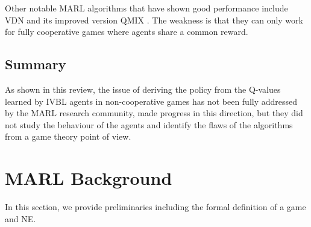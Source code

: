 \documentclass[]{interact}
\theoremstyle{plain}%
\theoremstyle{definition}
\theoremstyle{remark}
\begin{document}
Other notable MARL algorithms that have shown good performance include VDN \cite{sunehag2017value} and its improved version QMIX \cite{rashid2020monotonic}. The weakness is that they can only work for fully cooperative games where agents share a common reward.

\subsection{Summary}
As shown in this review, the issue of deriving the policy from the Q-values learned by IVBL agents in non-cooperative games has not been fully addressed by the MARL research community, \cite{bjornsson2009cadiaplayer, jiang2018q, kopacz2023evaluating, qu2020distributed} made progress in this direction, but they did not study the behaviour of the agents and identify the flaws of the algorithms from a game theory point of view.

\section{MARL Background}
In this section, we provide preliminaries including the formal definition of a game and NE.
\end{document}
